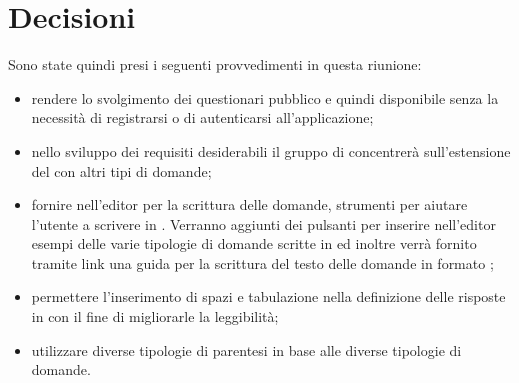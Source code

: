 \documentclass[12pt,a4paper]{article}
\begin{document}
\section{Decisioni}

Sono state quindi presi i seguenti provvedimenti in questa riunione:

\begin{itemize}
    \item rendere lo svolgimento dei questionari pubblico e quindi disponibile senza la necessità di registrarsi o di autenticarsi all'applicazione;
    \item nello sviluppo dei requisiti desiderabili il gruppo di concentrerà sull'estensione del  con altri tipi di domande;
    \item fornire nell'editor per la scrittura delle domande, strumenti per aiutare l'utente a scrivere in . Verranno aggiunti dei pulsanti per inserire nell'editor esempi delle varie tipologie di domande scritte in  ed inoltre verrà fornito tramite link una guida per la scrittura del testo delle domande in formato ;
    \item permettere l'inserimento di spazi e tabulazione nella definizione delle risposte in  con il fine di migliorarle la leggibilità;
    \item utilizzare diverse tipologie di parentesi in base alle diverse tipologie di domande. \TODO{}
    
\end{itemize}
\end{document}
